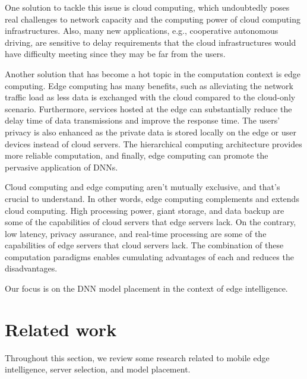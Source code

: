 \documentclass[lettersize,journal]{IEEEtran}
\begin{document}
One solution to tackle this issue is cloud computing, which undoubtedly poses real challenges to network capacity and the computing power of cloud computing infrastructures. Also, many new applications, e.g., cooperative autonomous driving, are sensitive to delay requirements that the cloud infrastructures would have difficulty meeting since they may be far from the users. 

Another solution that has become a hot topic in the computation context is edge computing. Edge computing has many benefits, such as alleviating the network traffic load as less data is exchanged with the cloud compared to the cloud-only scenario. Furthermore, services hosted at the edge can substantially reduce the delay time of data transmissions and improve the response time. The users' privacy is also enhanced as the private data is stored locally on the edge or user devices instead of cloud servers. The hierarchical computing architecture provides more reliable computation, and finally, edge computing can promote the pervasive application of DNNs.
 
Cloud computing and edge computing aren't mutually exclusive, and that's crucial to understand. In other words, edge computing complements and extends cloud computing. High processing power, giant storage, and data backup are some of the capabilities of cloud servers that edge servers lack. On the contrary, low latency, privacy assurance, and real-time processing are some of the capabilities of edge servers that cloud servers lack. The combination of these computation paradigms enables cumulating advantages of each and reduces the disadvantages.
 

Our focus is on the DNN model placement in the context of edge intelligence.

\section{Related work}
Throughout this section, we review some research related to mobile edge intelligence, server selection, and model placement.
\end{document}
